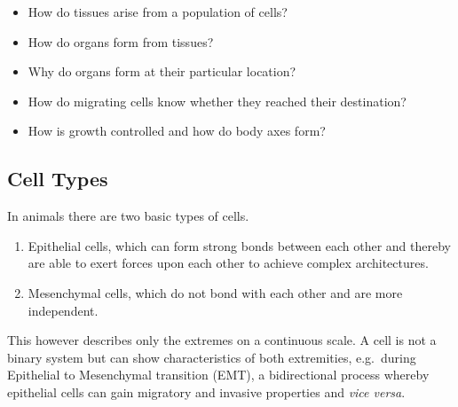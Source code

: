 \documentclass[11pt,singlespacinge,twoside]{reedthesis} %
\providecommand{\tightlist}{%
  \setlength{\itemsep}{0pt}\setlength{\parskip}{0pt}}
\def\labelenumi{\arabic{enumi}.}
\begin{document}
\begin{itemize}
\tightlist
\item
  How do tissues arise from a population of cells?
\item
  How do organs form from tissues?
\item
  Why do organs form at their particular location?
\item
  How do migrating cells know whether they reached their destination?
\item
  How is growth controlled and how do body axes form?
\end{itemize}
\hypertarget{cell-types}{%
\subsection{Cell Types}\label{cell-types}}

In animals there are two basic types of cells.
\begin{enumerate}
\def\labelenumi{\arabic{enumi}.}
\tightlist
\item
  Epithelial cells, which can form strong bonds between each other and thereby are able to exert forces upon each other to achieve complex architectures.
\item
  Mesenchymal cells, which do not bond with each other and are more independent.
\end{enumerate}
This however describes only the extremes on a continuous scale. A cell is not a binary system but can show characteristics of both extremities, e.g.~during Epithelial to Mesenchymal transition (EMT), a bidirectional process whereby epithelial cells can gain migratory and invasive properties and \emph{vice versa}.
\end{document}
